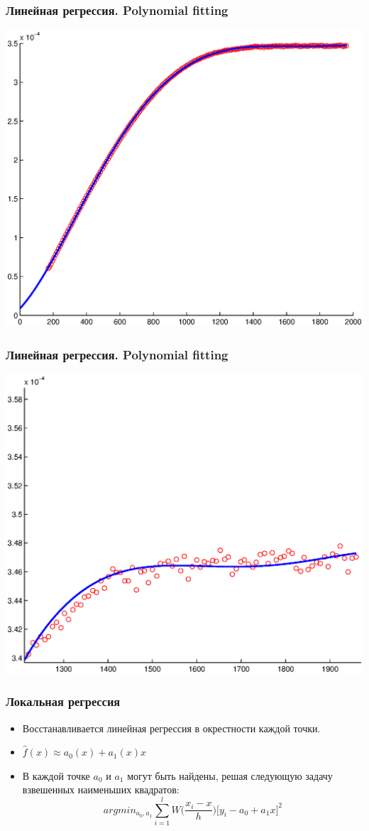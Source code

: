\documentclass[smaller]{beamer}
\begin{document}
\begin{frame}
  \frametitle{Линейная регрессия. Polynomial fitting}
\includegraphics[scale=0.4]{poly_fit.eps}
\end{frame}

\begin{frame}
  \frametitle{Линейная регрессия. Polynomial fitting}
\includegraphics[scale=0.4]{poly_fit_b.eps}
\end{frame}


\begin{frame}
  \frametitle{Локальная регрессия}
   \begin{itemize}
    \item Восстанавливается линейная регрессия в окрестности каждой точки. 
    \item $\hat{f}(x) \approx a_0(x)+a_1(x)x$
    \item В каждой точке $a_0$ и $a_1$ могут быть найдены, решая следующую задачу взвешенных наименьших квадратов:
      $$ argmin_{a_0, a_1} \sum_{i=1}^l W \biggl( \frac{x_i-x}h \biggr) \bigl[y_i-a_0 +a_1x\bigr]^2 $$
   \end{itemize}
\end{frame}
\end{document}
